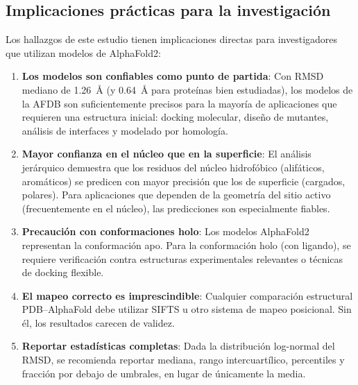 \subsection{Implicaciones pr\'acticas para la investigaci\'on}
\label{subsec:implicaciones_practicas}

Los hallazgos de este estudio tienen implicaciones directas para investigadores
que utilizan modelos de AlphaFold2:

\begin{enumerate}
    \item \textbf{Los modelos son confiables como punto de partida}: Con RMSD mediano
    de \SI{1,26}{\angstrom} (y \SI{0,64}{\angstrom} para prote\'inas bien estudiadas),
    los modelos de la AFDB son suficientemente precisos para la mayor\'ia de aplicaciones
    que requieren una estructura inicial: docking molecular, dise\~no de mutantes,
    an\'alisis de interfaces y modelado por homolog\'ia.

    \item \textbf{Mayor confianza en el n\'ucleo que en la superficie}: El an\'alisis
    jer\'arquico demuestra que los residuos del n\'ucleo hidrofóbico (alif\'aticos,
    arom\'aticos) se predicen con mayor precisi\'on que los de superficie (cargados,
    polares). Para aplicaciones que dependen de la geometr\'ia del sitio activo
    (frecuentemente en el n\'ucleo), las predicciones son especialmente fiables.

    \item \textbf{Precauci\'on con conformaciones holo}: Los modelos AlphaFold2
    representan la conformaci\'on apo. Para la conformaci\'on holo (con ligando),
    se requiere verificaci\'on contra estructuras experimentales relevantes o t\'ecnicas
    de docking flexible.

    \item \textbf{El mapeo correcto es imprescindible}: Cualquier comparaci\'on
    estructural PDB--AlphaFold debe utilizar SIFTS u otro sistema de mapeo posicional.
    Sin \'el, los resultados carecen de validez.

    \item \textbf{Reportar estad\'isticas completas}: Dada la distribuci\'on log-normal
    del RMSD, se recomienda reportar mediana, rango intercuart\'ilico, percentiles y
    fracci\'on por debajo de umbrales, en lugar de \'unicamente la media.
\end{enumerate}

